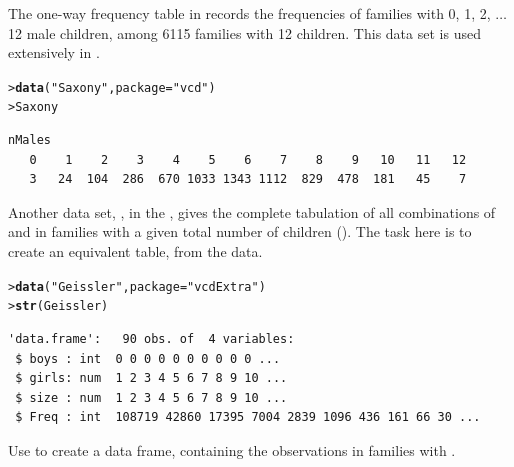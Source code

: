 \documentclass[10pt]{report}\usepackage[]{graphicx}\usepackage[]{color}
\makeatletter
\newcommand{\hlstr}[1]{\textcolor[rgb]{0.192,0.494,0.8}{#1}}%
\newcommand{\hlstd}[1]{\textcolor[rgb]{0.345,0.345,0.345}{#1}}%
\newcommand{\hlkwc}[1]{\textcolor[rgb]{0.333,0.667,0.333}{#1}}%
\newcommand{\hlkwd}[1]{\textcolor[rgb]{0.737,0.353,0.396}{\textbf{#1}}}%
\newenvironment{kframe}{%
 \def\at@end@of@kframe{}%
 \ifinner\ifhmode%
  \def\at@end@of@kframe{\end{minipage}}%
  \begin{minipage}{\columnwidth}%
 \fi\fi%
 \def\FrameCommand##1{\hskip\@totalleftmargin \hskip-\fboxsep
 \colorbox{shadecolor}{##1}\hskip-\fboxsep
     \hskip-\linewidth \hskip-\@totalleftmargin \hskip\columnwidth}%
 \MakeFramed {\advance\hsize-\width
   \@totalleftmargin\z@ \linewidth\hsize
   \@setminipage}}%
 {\par\unskip\endMakeFramed%
 \at@end@of@kframe}
\newenvironment{knitrout}{}{} %
\renewenvironment{knitrout}{\small\renewcommand{\baselinestretch}{.85}}{} %
\makeatother
\begin{document}
\begin{Exercises}
\exercise The one-way frequency table  in  records the frequencies
of families with 0, 1, 2, $\dots$ 12 male children, among 6115 families with 12
children.  This data set is used extensively in .
\begin{knitrout}\footnotesize
{}\color{fgcolor}\begin{kframe}
\begin{alltt}
\hlstd{> }\hlkwd{data}\hlstd{(}\hlstr{"Saxony"}\hlstd{,} \hlkwc{package} \hlstd{=} \hlstr{"vcd"}\hlstd{)}
\hlstd{> }\hlstd{Saxony}
\end{alltt}
\begin{verbatim}
nMales
   0    1    2    3    4    5    6    7    8    9   10   11   12 
   3   24  104  286  670 1033 1343 1112  829  478  181   45    7 
\end{verbatim}
\end{kframe}
\end{knitrout}
Another data set, , in the , gives the complete
tabulation of all combinations of  and  in families with
a given total number of children ().  The task here is to create an
equivalent table,  from the  data.
\begin{knitrout}\footnotesize
{}\color{fgcolor}\begin{kframe}
\begin{alltt}
\hlstd{> }\hlkwd{data}\hlstd{(}\hlstr{"Geissler"}\hlstd{,} \hlkwc{package} \hlstd{=} \hlstr{"vcdExtra"}\hlstd{)}
\hlstd{> }\hlkwd{str}\hlstd{(Geissler)}
\end{alltt}
\begin{verbatim}
'data.frame':	90 obs. of  4 variables:
 $ boys : int  0 0 0 0 0 0 0 0 0 0 ...
 $ girls: num  1 2 3 4 5 6 7 8 9 10 ...
 $ size : num  1 2 3 4 5 6 7 8 9 10 ...
 $ Freq : int  108719 42860 17395 7004 2839 1096 436 161 66 30 ...
\end{verbatim}
\end{kframe}
\end{knitrout}
  \begin{enumerate*}
    \item Use  to create a data frame,  containing
    the  observations in families with .
    \begin{ans}
\begin{knitrout}\footnotesize
{}\color{fgcolor}\begin{kframe}

\end{kframe}
\end{knitrout}
\end{ans}
\end{enumerate*}
\end{Exercises}
\end{document}
